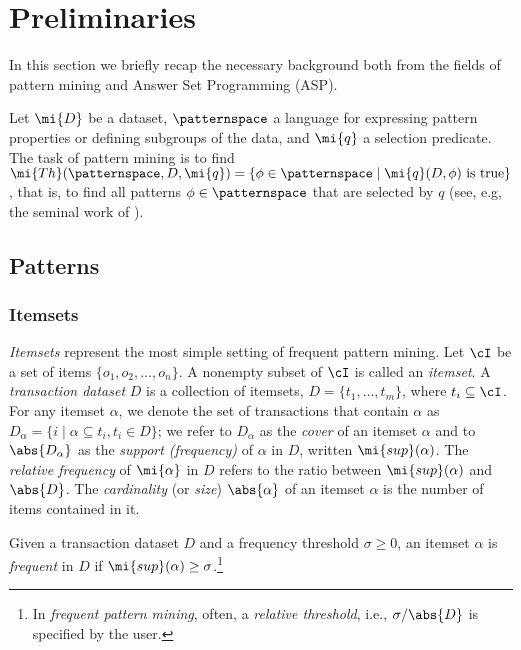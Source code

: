 \section{Preliminaries}\label{sec:prelim}
In this section we briefly recap the necessary background both from the fields of pattern mining and Answer Set Programming (ASP). 

Let $\mi{D}$ be a dataset, $\patternspace$ a language for expressing pattern properties or defining subgroups of the
data, and $\mi{q}$ a selection predicate. %
The task of pattern mining is to find $\mi{Th}(\patternspace,D, \mi{q})= \{\phi \in \patternspace \mid \mi{q}(D, \phi) \text{ is true}\}$, that is, to find all patterns $\phi\in\patternspace$ that are selected by $q$  (see, e.g, the seminal work of \textcite{DBLP:journals/datamine/MannilaT97}). 


\subsection{Patterns} 
\subsubsection{Itemsets}
 \emph{Itemsets} represent the most simple setting of frequent pattern mining. Let $\cI$
be a set of items $\{o_1,o_2,\dotsc,o_n\}$. A nonempty subset of $\cI$ is called an \emph{itemset}. A
\emph{transaction dataset} $D$ is a collection of itemsets, $D = \{t_1 ,\dotsc, t_m \}$, where $t_i\subseteq \cI$.
For any itemset $\alpha$, we denote the set of transactions that contain $\alpha$ as $D_{\alpha}= \{i\mid\alpha \subseteq t_i, t_i \in D\}$; we refer to $D_{\alpha}$ as the \emph{cover} of an itemset $\alpha$ and to $\abs{D_{\alpha}}$ as the \emph{support (frequency)} of $\alpha$ in $D$, written $\mi{sup}(\alpha)$. The \emph{relative frequency} of $\mi{\alpha}$ in $D$ refers to the ratio between $\mi{sup}(\alpha)$ and $\abs{D}$. %
The \emph{cardinality} (or \emph{size}) $\abs{\alpha}$ of an itemset $\alpha$ is %
the number of items contained in it. %

\begin{definition}\label{def:frit} 
 Given a transaction dataset $D$ and a frequency threshold $\sigma \geq 0$, an itemset $\alpha$ is \emph{frequent} in $D$ if  $\mi{sup}(\alpha)\geq \sigma$.\footnote{In \emph{frequent pattern mining}, often, a \emph{relative threshold}, i.e., $\sigma/\abs{D}$ is specified by the user.}
\end{definition}

